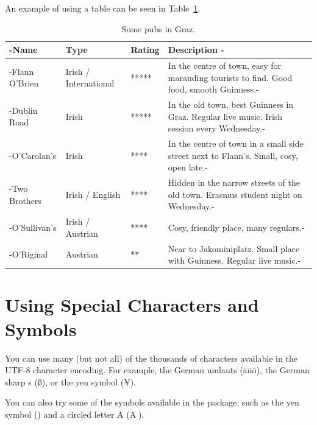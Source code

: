 An example of using a table can be seen in Table~\ref{tab:SomePubs}.

\begin{table}[tp]
\tablestretch
{}
\centering
\begin{tabularx}{\linewidth}
{>{\kern-\tabcolsep}lllX<{\kern-\tabcolsep}}
\toprule
\textbf{Name} & \textbf{Type} & \textbf{Rating} & \textbf{Description} \\
\midrule
Flann O'Brien & Irish / International & ***** &
In the centre of town, easy for
marauding tourists to find. Good food, smooth Guinness.\\
%
Dublin Road & Irish & ***** &
In the old town, best Guinness in Graz.
Regular live music. Irish session every Wednesday.\\
%
O'Carolan's & Irish & **** &
In the centre of town in a small side street next to Flann's.
Small, cosy, open late.\\
%
Two Brothers & Irish / English & **** &
Hidden in the narrow streets of the old town.
Erasmus student night on Wednesday.\\
%
O'Sullivan's & Irish / Austrian & **** &
Cosy, friendly place, many regulars.\\
%
O'Riginal & Austrian & ** &
Near to Jakominiplatz.
Small place with Guinness. Regular live music.\\
\bottomrule
\end{tabularx}

\caption[Some Pubs in Graz]
{
Some pubs in Graz.
}
\label{tab:SomePubs}
\end{table}









\section{Using Special Characters and Symbols}

You can use many (but not all) of the thousands of characters
available in the UTF-8 \parencites{Wikipedia-UTF8}{Unicode-Charts}
character encoding. For example, the German umlauts (äüö), the German
sharp s (ß), or the yen symbol (¥).

You can also try some of the  symbols available
in the  package, such as the yen symbol (\textyen) and
a circled letter A (\textcircled{A}).





